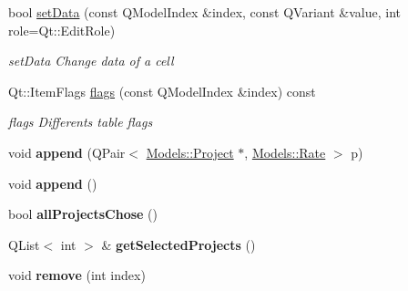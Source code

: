 \begin{DoxyCompactItemize}
bool \hyperlink{classGui_1_1Widgets_1_1WdgModels_1_1ProjectContributoriesTableModel_ac71dc1a97c5e62b4b51002ed737dad10}{set\-Data} (const Q\-Model\-Index \&index, const Q\-Variant \&value, int role=Qt\-::\-Edit\-Role)
\begin{DoxyCompactList}\small\item\em set\-Data Change data of a cell \end{DoxyCompactList}\item 
Qt\-::\-Item\-Flags \hyperlink{classGui_1_1Widgets_1_1WdgModels_1_1ProjectContributoriesTableModel_a75dd68e78aec7823ef07a01e861ff627}{flags} (const Q\-Model\-Index \&index) const 
\begin{DoxyCompactList}\small\item\em flags Differents table flags \end{DoxyCompactList}\item 
\hypertarget{classGui_1_1Widgets_1_1WdgModels_1_1ProjectContributoriesTableModel_a7bb1cd1299d72ce4d6a35cc38bff5a70}{void {\bfseries append} (Q\-Pair$<$ \hyperlink{classModels_1_1Project}{Models\-::\-Project} $\ast$, \hyperlink{classModels_1_1Rate}{Models\-::\-Rate} $>$ p)}\label{classGui_1_1Widgets_1_1WdgModels_1_1ProjectContributoriesTableModel_a7bb1cd1299d72ce4d6a35cc38bff5a70}

\item 
\hypertarget{classGui_1_1Widgets_1_1WdgModels_1_1ProjectContributoriesTableModel_a1ff13a691bf3609677318d6ad16f81a2}{void {\bfseries append} ()}\label{classGui_1_1Widgets_1_1WdgModels_1_1ProjectContributoriesTableModel_a1ff13a691bf3609677318d6ad16f81a2}

\item 
\hypertarget{classGui_1_1Widgets_1_1WdgModels_1_1ProjectContributoriesTableModel_a700d8e8e545e3d048d3d5aa78467e7eb}{bool {\bfseries all\-Projects\-Chose} ()}\label{classGui_1_1Widgets_1_1WdgModels_1_1ProjectContributoriesTableModel_a700d8e8e545e3d048d3d5aa78467e7eb}

\item 
\hypertarget{classGui_1_1Widgets_1_1WdgModels_1_1ProjectContributoriesTableModel_ab32f6d5b6e708b08cce0a83411f1eedc}{Q\-List$<$ int $>$ \& {\bfseries get\-Selected\-Projects} ()}\label{classGui_1_1Widgets_1_1WdgModels_1_1ProjectContributoriesTableModel_ab32f6d5b6e708b08cce0a83411f1eedc}

\item 
\hypertarget{classGui_1_1Widgets_1_1WdgModels_1_1ProjectContributoriesTableModel_ae142b64f61cf2337cf3fcb3d6ce291ec}{void {\bfseries remove} (int index)}\label{classGui_1_1Widgets_1_1WdgModels_1_1ProjectContributoriesTableModel_ae142b64f61cf2337cf3fcb3d6ce291ec}


\end{DoxyCompactItemize}
